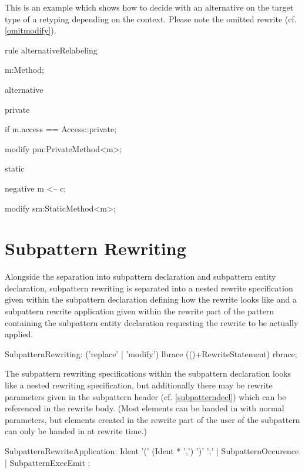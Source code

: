 \begin{example}
This is an example which shows how to decide with an alternative on the target type of a retyping depending on the context.
Please note the omitted rewrite (cf. \ref{omitmodify}).

  \begin{grgen}
rule alternativeRelabeling
{
  m:Method;
  
  alternative {
    private {
      if { m.access == Access::private; }

      modify {
        pm:PrivateMethod<m>;
      }
    }
    static {
      negative {
        m <-- c;
      }

      modify {
        sm:StaticMethod<m>;
      }
    }
  } 
}
  \end{grgen}
\end{example}


\section{Subpattern Rewriting}
\label{sec:subrule}

Alongside the separation into subpattern declaration and subpattern entity declaration, 
subpattern rewriting is separated into a nested rewrite specification given within the subpattern declaration defining how the rewrite looks like 
and a subpattern rewrite application given within the rewrite part of the pattern containing the subpattern entity declaration requesting the rewrite to be actually applied.

\pagebreak

\begin{rail}  
  SubpatternRewriting: ('replace' | 'modify') lbrace (()+RewriteStatement) rbrace;
\end{rail}

The subpattern rewriting specifications within the subpattern declaration looks like a nested rewriting specification,
but additionally there may be rewrite parameters given in the subpattern header (cf. \ref{subpatterndecl}) which can be referenced in the rewrite body.
(Most elements can be handed in with normal parameters, but elements created in the rewrite part of the user of the subpattern can only be handed in at rewrite time.) 

\begin{rail}  
  SubpatternRewriteApplication: 
    Ident '(' (Ident * ',') ')' ';' |
    SubpatternOccurence |
    SubpatternExecEmit
	;
\end{rail}

